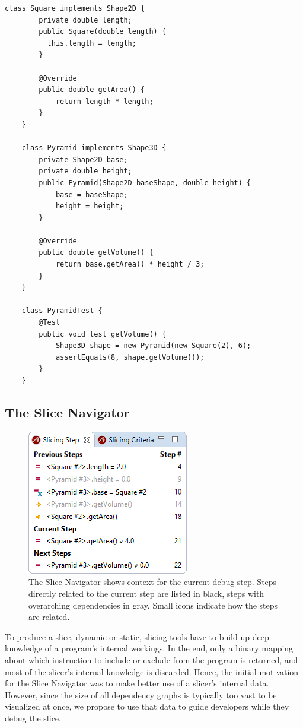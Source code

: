 \begin{lstlisting}[float=t,label=lst:example,caption={Example program with a failing test case}]
	class Square implements Shape2D {
		private double length;
		public Square(double length) { 
		  this.length = length;
		}
		
		@Override
		public double getArea() { 
			return length * length;
		}
	}
	
	class Pyramid implements Shape3D {
		private Shape2D base;
		private double height;
		public Pyramid(Shape2D baseShape, double height) {
			base = baseShape;
			height = height;
		}
		
		@Override
		public double getVolume() { 
			return base.getArea() * height / 3; 
		}
	}
	
	class PyramidTest {
		@Test
		public void test_getVolume() {
			Shape3D shape = new Pyramid(new Square(2), 6);
			assertEquals(8, shape.getVolume());
		}
	}
\end{lstlisting}

\subsection{The Slice Navigator}

\begin{figure}
	\centering
		\includegraphics[width=0.40\linewidth]{img/slice1.png}
	\caption{The Slice Navigator shows context for the current debug step. Steps directly related to the current step are listed in black, steps with overarching dependencies in gray. Small icons indicate how the steps are related.}
	\label{fig:slice1}
\end{figure}

To produce a slice, dynamic or static, slicing tools have to build up deep knowledge of a program's internal workings.
In the end, only a binary mapping about which instruction to include or exclude from the program is returned, and most of the slicer's internal knowledge is discarded.
Hence, the initial motivation for the Slice Navigator was to make better use of a slicer's internal data.
However, since the size of all dependency graphs is typically too vast to be visualized at once, we propose to use that data to guide developers while they debug the slice.


